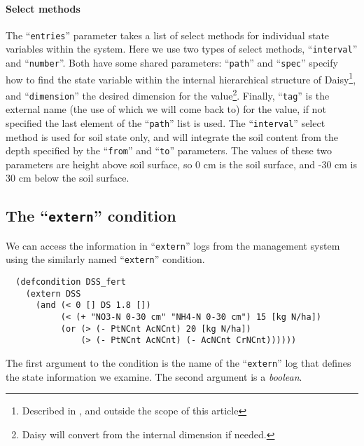 \documentclass[a4paper]{article}
\newcommand{\dname}[1]{``\texttt{#1}''}
\begin{document}
\paragraph{Select methods} The \dname{entries} parameter takes a list
of select methods for individual state variables within the system.
Here we use two types of select methods, \dname{interval} and
\dname{number}.  Both have some shared parameters: \dname{path} and
\dname{spec} specify how to find the state variable within the
internal hierarchical structure of Daisy\footnote{Described in
  \cite{daisy-ref}, and outside the scope of this article}, and
\dname{dimension} the desired dimension for the value\footnote{Daisy
  will convert from the internal dimension if needed.}.  Finally,
\dname{tag} is the external name (the use of which we will come back
to) for the value, if not specified the last element of the
\dname{path} list is used.  The \dname{interval} select method is used
for soil state only, and will integrate the soil content from the
depth specified by the \dname{from} and \dname{to} parameters.  The
values of these two parameters are height above soil surface, so 0 cm
is the soil surface, and -30 cm is 30 cm below the soil surface.

\subsection{The \dname{extern} condition}

We can access the information in \dname{extern} logs from the
management system using the similarly named \dname{extern} condition.
\begin{verbatim}
  (defcondition DSS_fert
    (extern DSS 
      (and (< 0 [] DS 1.8 [])
           (< (+ "NO3-N 0-30 cm" "NH4-N 0-30 cm") 15 [kg N/ha])
           (or (> (- PtNCnt AcNCnt) 20 [kg N/ha])
               (> (- PtNCnt AcNCnt) (- AcNCnt CrNCnt))))))
\end{verbatim}
The first argument to the condition is the name of the \dname{extern}
log that defines the state information we examine.  The second
argument is a \emph{boolean}. 
\end{document}
